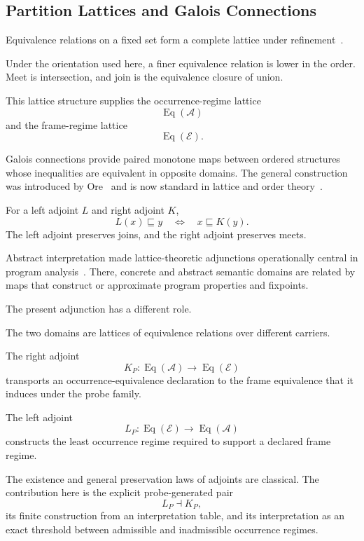 \documentclass[11pt]{article}
\theoremstyle{plain}
\theoremstyle{definition}
\theoremstyle{remark}
\begin{document}
\subsection{Partition Lattices and Galois Connections}

Equivalence relations on a fixed set form a complete lattice
under refinement~\citep{daveypriestley2002}.

Under the orientation used here,
a finer equivalence relation is lower in the order.
Meet is intersection, and join is the equivalence closure of union.

This lattice structure supplies the occurrence-regime lattice
\[
  \operatorname{Eq}(\mathcal{A})
\]
and the frame-regime lattice
\[
  \operatorname{Eq}(\mathcal{E}).
\]

Galois connections provide paired monotone maps
between ordered structures whose inequalities are equivalent
in opposite domains.
The general construction was introduced by Ore~\citep{ore1944galois}
and is now standard in lattice and order theory~\citep{daveypriestley2002}.

For a left adjoint \(L\) and right adjoint \(K\),
\[
  L(x)
  \sqsubseteq
  y
  \quad\Longleftrightarrow\quad
  x
  \sqsubseteq
  K(y).
\]
The left adjoint preserves joins, and the right adjoint preserves meets.

Abstract interpretation made lattice-theoretic adjunctions
operationally central
in program analysis~\citep{cousot1977abstract}.
There, concrete and abstract semantic domains
are related by maps that construct or approximate
program properties and fixpoints.

The present adjunction has a different role.

The two domains are lattices of equivalence relations over different carriers.

The right adjoint
\[
  K_P:
  \operatorname{Eq}(\mathcal{A})
  \longrightarrow
  \operatorname{Eq}(\mathcal{E})
\]
transports an occurrence-equivalence declaration
to the frame equivalence
that it induces under the probe family.

The left adjoint
\[
  L_P:
  \operatorname{Eq}(\mathcal{E})
  \longrightarrow
  \operatorname{Eq}(\mathcal{A})
\]
constructs the least occurrence regime
required to support a declared frame regime.

The existence and general preservation laws of adjoints are classical.
The contribution here is the explicit probe-generated pair
\[
  L_P
  \dashv
  K_P,
\]
its finite construction from an interpretation table,
and its interpretation
as an exact threshold
between admissible and inadmissible occurrence regimes.
\end{document}
